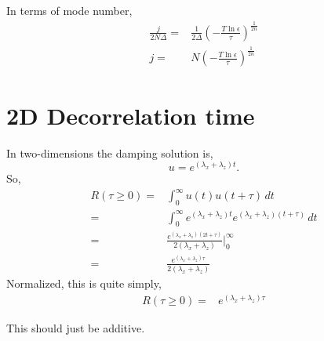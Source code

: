 \documentclass[11pt, oneside]{article}   	%
\begin{document}
In terms of mode number,
\begin{align}
\frac{j}{2 N \Delta} =& \frac{1}{2 \Delta} \left( -\frac{T \ln \epsilon}{ \tau} \right)^{\frac{1}{2n}} \\
j =&  N \left( -\frac{T \ln \epsilon}{ \tau} \right)^{\frac{1}{2n}}
\end{align}

%
\section{2D Decorrelation time}
%

In two-dimensions the damping solution is,
\begin{equation}
u = e^{ (\lambda_x+\lambda_z) t}.
\end{equation}
So,
\begin{align}
R(\tau \geq 0) =& \int_0^\infty u(t)u(t+\tau) \, dt \\
=&\int_0^\infty e^{(\lambda_x+\lambda_z)  t} e^{(\lambda_x+\lambda_z)  (t + \tau) } \, dt \\
=& \frac{e^{ (\lambda_x+\lambda_z) (2t + \tau)}}{2 (\lambda_x+\lambda_z) } \biggr\rvert_0^\infty \\
=&  \frac{e^{ (\lambda_x+\lambda_z) \tau }}{2 (\lambda_x+\lambda_z) } 
\end{align}
Normalized, this is quite simply,
\begin{align}
R(\tau \geq 0) =&  e^{ (\lambda_x+\lambda_z) \tau }
\end{align}

This should just be additive. 
\end{document}
